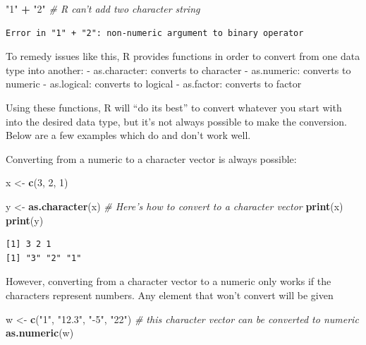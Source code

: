 \documentclass[
]{book}
\newenvironment{Shaded}{\begin{snugshade}}{\end{snugshade}}
\newcommand{\CommentTok}[1]{\textcolor[rgb]{0.56,0.35,0.01}{\textit{#1}}}
\newcommand{\DecValTok}[1]{\textcolor[rgb]{0.00,0.00,0.81}{#1}}
\newcommand{\KeywordTok}[1]{\textcolor[rgb]{0.13,0.29,0.53}{\textbf{#1}}}
\newcommand{\NormalTok}[1]{#1}
\newcommand{\OperatorTok}[1]{\textcolor[rgb]{0.81,0.36,0.00}{\textbf{#1}}}
\newcommand{\StringTok}[1]{\textcolor[rgb]{0.31,0.60,0.02}{#1}}
\begin{document}
\begin{Shaded}
\begin{Highlighting}[]
\StringTok{"1"} \OperatorTok{+}\StringTok{ "2"}   \CommentTok{# R can't add two character string}
\end{Highlighting}
\end{Shaded}

\begin{verbatim}
Error in "1" + "2": non-numeric argument to binary operator
\end{verbatim}

To remedy issues like this, R provides functions in order to convert from one data type into another:
- as.character: converts to character
- as.numeric: converts to numeric
- as.logical: converts to logical
- as.factor: converts to factor

Using these functions, R will ``do its best'' to convert whatever you start with into the desired data type, but it's not always possible to make the conversion.
Below are a few examples which do and don't work well.

Converting from a numeric to a character vector is always possible:

\begin{Shaded}
\begin{Highlighting}[]
\NormalTok{x <-}\StringTok{ }\KeywordTok{c}\NormalTok{(}\DecValTok{3}\NormalTok{, }\DecValTok{2}\NormalTok{, }\DecValTok{1}\NormalTok{)}
\end{Highlighting}
\end{Shaded}

\begin{Shaded}
\begin{Highlighting}[]
\NormalTok{y <-}\StringTok{ }\KeywordTok{as.character}\NormalTok{(x)   }\CommentTok{# Here's how to convert to a character vector}
\KeywordTok{print}\NormalTok{(x)}
\KeywordTok{print}\NormalTok{(y)}
\end{Highlighting}
\end{Shaded}

\begin{verbatim}
[1] 3 2 1
[1] "3" "2" "1"
\end{verbatim}

However, converting from a character vector to a numeric only works if the characters represent numbers.
Any element that won't convert will be given

\begin{Shaded}
\begin{Highlighting}[]
\NormalTok{w <-}\StringTok{ }\KeywordTok{c}\NormalTok{(}\StringTok{"1"}\NormalTok{, }\StringTok{"12.3"}\NormalTok{, }\StringTok{"-5"}\NormalTok{, }\StringTok{"22"}\NormalTok{)   }\CommentTok{# this character vector can be converted to numeric}
\KeywordTok{as.numeric}\NormalTok{(w)}
\end{Highlighting}
\end{Shaded}
\end{document}
